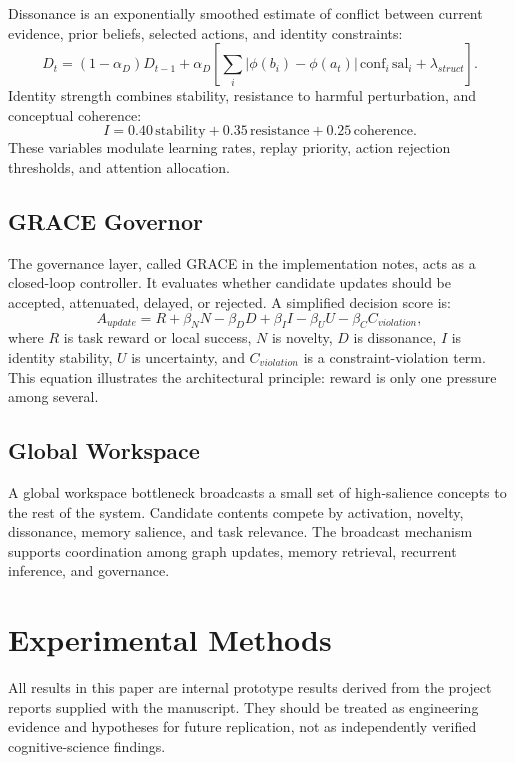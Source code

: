 \documentclass[11pt]{article}
\begin{document}
Dissonance is an exponentially smoothed estimate of conflict between current evidence, prior beliefs, selected actions, and identity constraints:
\begin{equation}
 D_t=(1-\alpha_D)D_{t-1}+\alpha_D\left[\sum_i \left|\phi(b_i)-\phi(a_t)\right|\,\mathrm{conf}_i\,\mathrm{sal}_i+\lambda_{struct}\right].
\end{equation}
Identity strength combines stability, resistance to harmful perturbation, and conceptual coherence:
\begin{equation}
 I = 0.40\,\mathrm{stability}+0.35\,\mathrm{resistance}+0.25\,\mathrm{coherence}.
\end{equation}
These variables modulate learning rates, replay priority, action rejection thresholds, and attention allocation.

\subsection{GRACE Governor}
The governance layer, called GRACE in the implementation notes, acts as a closed-loop controller. It evaluates whether candidate updates should be accepted, attenuated, delayed, or rejected. A simplified decision score is:
\begin{equation}
 A_{update}=R + \beta_N N - \beta_D D + \beta_I I - \beta_U U - \beta_C C_{violation},
\end{equation}
where $R$ is task reward or local success, $N$ is novelty, $D$ is dissonance, $I$ is identity stability, $U$ is uncertainty, and $C_{violation}$ is a constraint-violation term. This equation illustrates the architectural principle: reward is only one pressure among several.

\subsection{Global Workspace}
A global workspace bottleneck broadcasts a small set of high-salience concepts to the rest of the system. Candidate contents compete by activation, novelty, dissonance, memory salience, and task relevance. The broadcast mechanism supports coordination among graph updates, memory retrieval, recurrent inference, and governance.

\section{Experimental Methods}
All results in this paper are internal prototype results derived from the project reports supplied with the manuscript. They should be treated as engineering evidence and hypotheses for future replication, not as independently verified cognitive-science findings.
\end{document}
